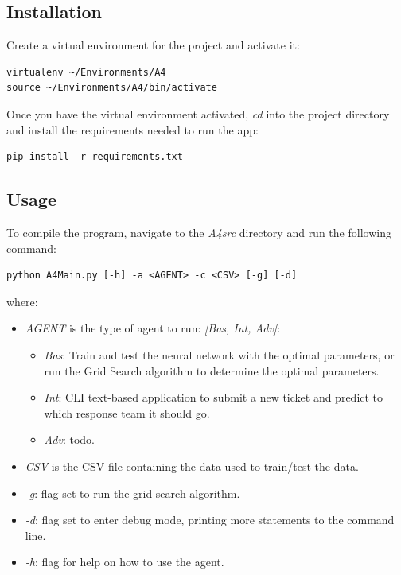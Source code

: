 \documentclass[letterpaper,12pt]{article}
\begin{document}
\subsection{Installation}

Create a virtual environment for the project and activate it:

\begin{lstlisting}
virtualenv ~/Environments/A4
source ~/Environments/A4/bin/activate
\end{lstlisting}

Once you have the virtual environment activated, \textit{cd} into the project directory and install the requirements needed to run the app:

\begin{lstlisting}
pip install -r requirements.txt
\end{lstlisting}

\subsection{Usage}

To compile the program, navigate to the \textit{A4src} directory and run the following command:

\begin{lstlisting}
python A4Main.py [-h] -a <AGENT> -c <CSV> [-g] [-d]
\end{lstlisting}

where:

\begin{itemize}
    \item \textit{AGENT} is the type of agent to run: \textit{[Bas, Int, Adv]}:
    \begin{itemize}
        \item \textit{Bas}: Train and test the neural network with the optimal parameters, or run the Grid Search algorithm to determine the optimal parameters.
        \item \textit{Int}: CLI text-based application to submit a new ticket and predict to which response team it should go.
        \item \textit{Adv}: todo.
    \end{itemize}
    \item \textit{CSV} is the CSV file containing the data used to train/test the data.
    \item \textit{-g}: flag set to run the grid search algorithm.
    \item \textit{-d}: flag set to enter debug mode, printing more statements to the command line.
    \item \textit{-h}: flag for help on how to use the agent.
\end{itemize}
\end{document}
